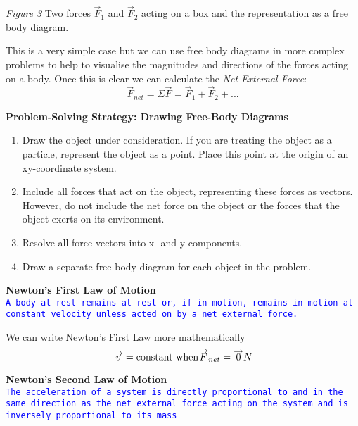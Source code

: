 \documentclass[12pt, letterpaper, twoside]{article}
\begin{document}
\bigskip
\emph{Figure 3} Two forces $\overrightarrow{F}_1$ and $\overrightarrow{F}_2$ acting on a box and the representation as a free body diagram.  

\bigskip 

This is a very simple case but we can use free body diagrams in more complex problems to help to visualise the magnitudes and directions of the forces acting on a body.  Once this is clear we can calculate the \emph{Net External Force}:
\begin{equation}
\overrightarrow{F}_{net} = \Sigma \overrightarrow{F} = \overrightarrow{F}_1+\overrightarrow{F}_2 +...
\end{equation}

\bigskip
\textbf{Problem-Solving Strategy: Drawing Free-Body Diagrams}
\begin{enumerate}
	\item Draw the object under consideration. If you are treating the object as a particle, represent the object as a point. Place this point at the origin of an xy-coordinate system.
	\item Include all forces that act on the object, representing these forces as vectors. However, do not include the net force on the object or the forces that the object exerts on its environment.
	\item Resolve all force vectors into x- and y-components.
	\item Draw a separate free-body diagram for each object in the problem.
\end{enumerate}

\bigskip

\textbf{Newton’s First Law of Motion}\\
\texttt{\textcolor{blue}{A body at rest remains at rest or, if in motion, remains in motion at constant velocity unless acted on by a net external force.}}

\bigskip
We can write Newton's First Law more mathematically
\begin{equation}
\overrightarrow{v} = \textnormal{constant when} \overrightarrow{F}_{net} = \overrightarrow{0} N
\end{equation}

\bigskip
\textbf{Newton’s Second Law of Motion}\\
\texttt{\textcolor{blue}{The acceleration of a system is directly proportional to and in the same direction as the net external force acting on the system and is inversely proportional to its mass}}

\bigskip
\end{document}
